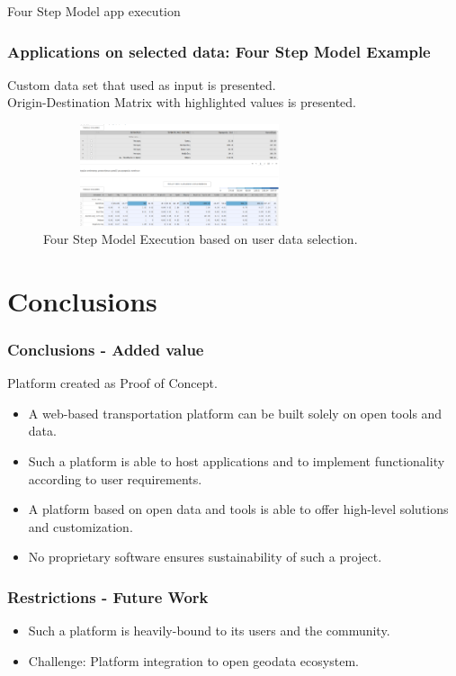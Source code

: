 \documentclass{beamer}
\begin{document}
    \begin{frame}
    
    \begin{exampleblock}{Four Step Model app execution}
    \frametitle{Applications on selected data: Four Step Model Example}
	    \checkmark Custom data set that used as input is presented.\\
	    \checkmark Origin-Destination Matrix with highlighted values is presented.
	\end{exampleblock}
	
	\begin{figure}[h]
    \centering
    \includegraphics[width=8cm, height=3cm]{08_4sm}
    \caption{Four Step Model Execution based on user data selection.}
    \label{fig:4sm}
    \end{figure}
    
    \end{frame}

\section{Conclusions}

	\begin{frame}
    \frametitle{Conclusions - Added value}
    Platform created as Proof of Concept.
    \begin{itemize}
        \item A web-based transportation platform can be built solely on open tools and data.
        \item Such a platform is able to host applications and to implement functionality according to user requirements.
        \item A platform based on open data and tools is able to offer high-level solutions and customization.
        \item No proprietary software ensures sustainability of such a project.
    \end{itemize}
    
    \end{frame}
    
    \begin{frame}
    \frametitle{Restrictions - Future Work}
    \begin{itemize}
        \item Such a platform is heavily-bound to its users and the community.
        \item Challenge: Platform integration to open geodata ecosystem.
    \end{itemize}
    
    \end{frame}
    
\end{document}
